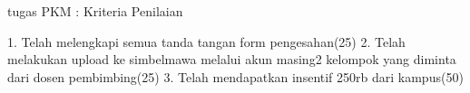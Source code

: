 tugas PKM :
Kriteria Penilaian

1. Telah melengkapi semua tanda tangan form pengesahan(25)
2. Telah melakukan upload ke simbelmawa melalui akun masing2 kelompok yang diminta dari dosen pembimbing(25)
3. Telah mendapatkan insentif 250rb dari kampus(50)
